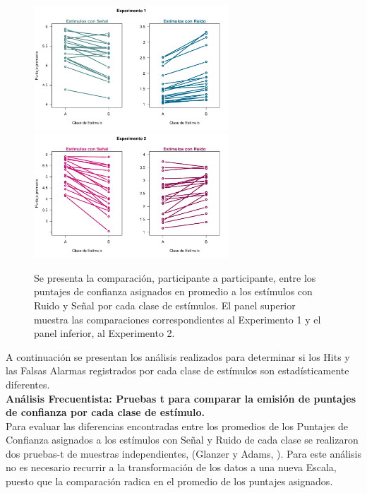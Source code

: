 \begin{figure}[th]
\centering
\includegraphics[width=0.65\textwidth]{Figures/Diff_Rating_E1}\\ 
\includegraphics[width=0.65\textwidth]{Figures/Diff_Rating_E2}\\
\caption[Diferencias entre los Puntajes de Confianza promedio asignados a los estímulos con Señal y Ruido de cada clase]{Se presenta la comparación, participante a participante, entre los puntajes de confianza asignados en promedio a los estímulos con Ruido y Señal por cada clase de estímulos. El panel superior muestra las comparaciones correspondientes al Experimento 1 y el panel inferior, al Experimento 2.}
\label{fig:Diff_Ratings}
\end{figure}

A continuación se presentan los análisis realizados para determinar si los Hits y las Falsas Alarmas registrados por cada clase de estímulos son estadísticamente diferentes.\\

\textbf{Análisis Frecuentista: Pruebas t para comparar la emisión de puntajes de confianza por cada clase de estímulo.}\\

Para evaluar las diferencias encontradas entre los promedios de los Puntajes de Confianza asignados a los estímulos con Señal y Ruido de cada clase se realizaron  dos pruebas-t de muestras independientes, (Glanzer y Adams, \citeyear{Glanzer1990}). Para este análisis no es necesario recurrir a la transformación de los datos a una nueva Escala, puesto que la comparación radica en el promedio de los puntajes asignados.\\

